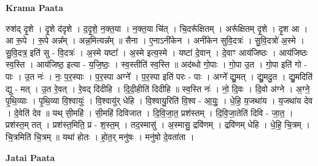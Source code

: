 \documentclass[17pt]{extarticle}
\begin{document}
\textbf{Krama Paata} \newline

रुश॑द् दृ॒शे । दृ॒शे द॑दृशे । द॒दृ॒शे॒ न॒क्त॒या । न॒क्त॒या चि॑त् । चि॒दरू᳚क्षितम् । अरू᳚क्षितम् दृ॒शे । दृ॒श आ । आ रू॒पे । रू॒पे अन्न᳚म् । अन्न॒मित्यन्न᳚म् ॥ सैना । ए॒नाऽनी॑केन । अनी॑केन सुवि॒दत्रः॑ । सु॒वि॒दत्रो॑ अ॒स्मे । सु॒वि॒दत्र॒ इति॑ सु - वि॒दत्रः॑ । अ॒स्मे यष्टा᳚ । अ॒स्मे इत्य॒स्मे । यष्टा॑ दे॒वान् । दे॒वाꣳ आय॑जिष्ठः । आय॑जिष्ठः स्व॒स्ति । आय॑जिष्ठ॒ इत्या - य॒जि॒ष्ठः॒ । स्व॒स्तीति॑ स्व॒स्ति ॥ अद॑ब्धो गो॒पाः । गो॒पा उ॒त । गो॒पा इति॑ गो - पाः । उ॒त नः॑ । नः॒ प॒र॒स्पाः । प॒र॒स्पा अग्ने᳚ । प॒र॒स्पा इति॑ परः - पाः । अग्ने᳚ द्यु॒मत् । द्यु॒मदु॒त । द्यु॒मदिति॑ द्यु - मत् । उ॒त रे॒वत् । रे॒वद् दि॑दीहि । दि॒दी॒हीति॑ दिदीहि ॥ स्व॒स्ति नः॑ । नो॒ दि॒वः । दि॒वो अ॑ग्ने । अ॒ग्ने॒ पृ॒थि॒व्याः । पृ॒थि॒व्या वि॒श्वायुः॑ । वि॒श्वायु॑र् धेहि । वि॒श्वायु॒रिति॑ वि॒श्व - आ॒युः॒ । धे॒हि॒ य॒जथा॑य । य॒जथा॑य देव । दे॒वेति॑ देव ॥ यथ् सी॒महि॑ । सी॒महि॑ दिविजात । दि॒वि॒जा॒त॒ प्रश॑स्तम् । दि॒वि॒जा॒तेति॑ दिवि - जा॒त॒ । प्रश॑स्त॒म् तत् । प्रश॑स्त॒मिति॒ प्र - श॒स्त॒म् । तद॒स्मासु॑ । अ॒स्मासु॒ द्रवि॑णम् । द्रवि॑णम् धेहि । धे॒हि॒ चि॒त्रम् । चि॒त्रमिति॑ चि॒त्रम् ॥ यथा॑ होतः । हो॒त॒र् मनु॑षः । मनु॑षो दे॒वता॑ता । \newline

\textbf{Jatai Paata} \newline
\end{document}

